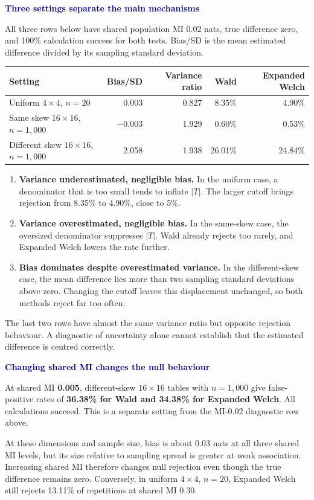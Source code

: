 \documentclass[11pt,a4paper]{article}
\newcommand{\subhead}[1]{\par\medskip\textbf{\textcolor{navy}{#1}}\par\smallskip}
\begin{document}
\subhead{Three settings separate the main mechanisms}
All three rows below have shared population MI 0.02 nats, true difference zero, and 100\% calculation success for both tests. Bias/SD is the mean estimated difference divided by its sampling standard deviation.
\begin{center}
\begin{tabular}{@{}lrrrr@{}}\toprule
Setting & Bias/SD & Variance ratio & Wald & Expanded Welch\\\midrule
Uniform \(4\times4\), \(n=20\) & 0.003 & 0.827 & 8.35\% & 4.90\%\\
Same skew \(16\times16\), \(n=1{,}000\) & $-0.003$ & 1.929 & 0.60\% & 0.53\%\\
Different skew \(16\times16\), \(n=1{,}000\) & 2.058 & 1.938 & 26.01\% & 24.84\%\\\bottomrule
\end{tabular}
\end{center}
\begin{enumerate}
\item \textbf{Variance underestimated, negligible bias.} In the uniform case, a denominator that is too small tends to inflate \(|T|\). The larger cutoff brings rejection from 8.35\% to 4.90\%, close to 5\%.
\item \textbf{Variance overestimated, negligible bias.} In the same-skew case, the oversized denominator suppresses \(|T|\). Wald already rejects too rarely, and Expanded Welch lowers the rate further.
\item \textbf{Bias dominates despite overestimated variance.} In the different-skew case, the mean difference lies more than two sampling standard deviations above zero. Changing the cutoff leaves this displacement unchanged, so both methods reject far too often.
\end{enumerate}
The last two rows have almost the same variance ratio but opposite rejection behaviour. A diagnostic of uncertainty alone cannot establish that the estimated difference is centred correctly.

\subhead{Changing shared MI changes the null behaviour}
At shared MI \textbf{0.005}, different-skew \(16\times16\) tables with \(n=1{,}000\) give false-positive rates of \textbf{36.38\% for Wald and 34.38\% for Expanded Welch}. All calculations succeed. This is a separate setting from the MI-0.02 diagnostic row above.

At these dimensions and sample size, bias is about 0.03 nats at all three shared MI levels, but its size relative to sampling spread is greater at weak association. Increasing shared MI therefore changes null rejection even though the true difference remains zero. Conversely, in uniform \(4\times4\), \(n=20\), Expanded Welch still rejects 13.11\% of repetitions at shared MI 0.30.
\end{document}
